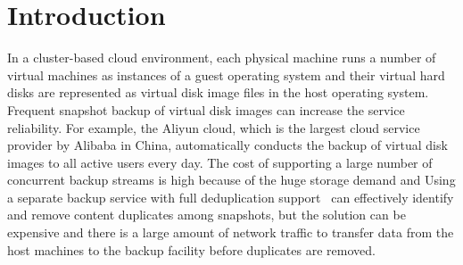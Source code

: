 \section{Introduction}
In a cluster-based cloud environment,
each physical machine runs a number  of virtual machines as  instances of a guest operating system 
and their  virtual hard disks are represented as virtual disk image files in the host operating system.
Frequent  snapshot backup of virtual disk images  can increase  the service reliability. 
For example, the Aliyun cloud, which is  the largest cloud service provider by Alibaba in China, 
automatically conducts  the backup of virtual disk images to all active users every day.
The cost of supporting a large number of concurrent backup streams is high
because of the huge storage demand and  
Using a separate  backup service with full deduplication support~\cite{venti02,bottleneck08}
can effectively identify and remove content duplicates among snapshots, 
but the solution can be expensive and there is a large amount of 
network traffic to transfer  data from the host machines to the backup facility
before duplicates are removed.


